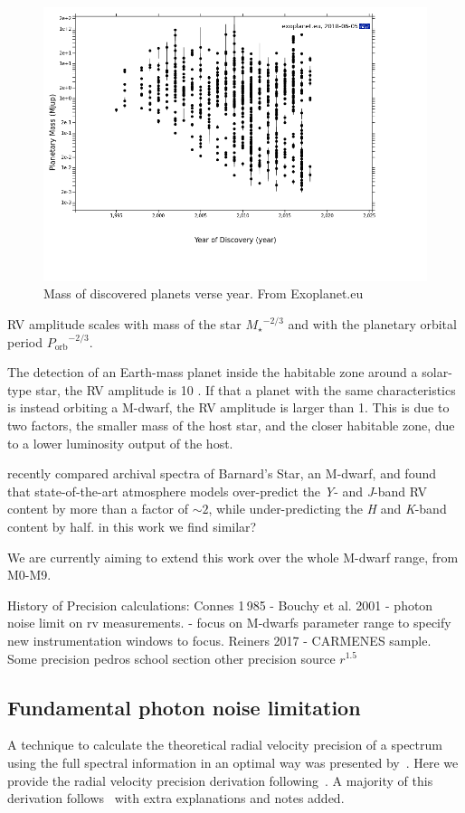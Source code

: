 \begin{figure}
\includegraphics[width=0.8\linewidth]{figures/year_planet_mass.png}
\caption{Mass of discovered planets verse year.
From Exoplanet.eu}
\label{fig:year_mass}
\end{figure}


{RV} amplitude scales with mass of the star \({M_{\star}}^{-2/3}\) and with the planetary orbital period \({P_{\textrm{orb}}}^{-2/3}\).

The detection of an Earth-mass planet inside the habitable zone around a solar-type star, the {RV} amplitude is 10 \cmps{}.
If that a planet with the same characteristics is instead orbiting a {M-dwarf}, the {RV} amplitude is larger than 1\mps{}.
This is due to two factors, the smaller mass of the host star, and the closer habitable zone, due to a lower luminosity output of the host.

\citet{artigau_optical_2018} recently compared archival spectra of Barnard's Star, an {M-dwarf}, and found that state-of-the-art atmosphere models over-predict the \emph{Y}- and \emph{J}-band {RV} content by more than a factor of \(\sim 2\), while under-predicting the \emph{H} and \emph{K}-band content by half.
{\red{} in this work we find similar?}

We are currently aiming to extend this work over the whole {M-dwarf} range, from {M0}-{M9}.

History of Precision calculations:
Connes 1\,985 -
Bouchy et al.
2001  - photon noise limit on rv measurements.
\cite{figueira_radial_2016} - focus on {M-dwarfs} parameter range to specify new instrumentation windows to focus.
Reiners 2017 -  {CARMENES} sample.
Some precision
pedros school section other precision source \({r}^{1.5}\)


\subsection{Fundamental photon noise limitation}
\label{fundamental_precision}
A technique to calculate the theoretical radial velocity precision of a spectrum using the full spectral information in an optimal way was presented by~\citet{connes_absolute_1985}.
Here we provide the radial velocity precision derivation following~\citet{connes_absolute_1985, bouchy_fundamental_2001, figueira_radial_2016}.
A majority of this derivation follows~\citet{bouchy_fundamental_2001} with extra explanations and notes added.

